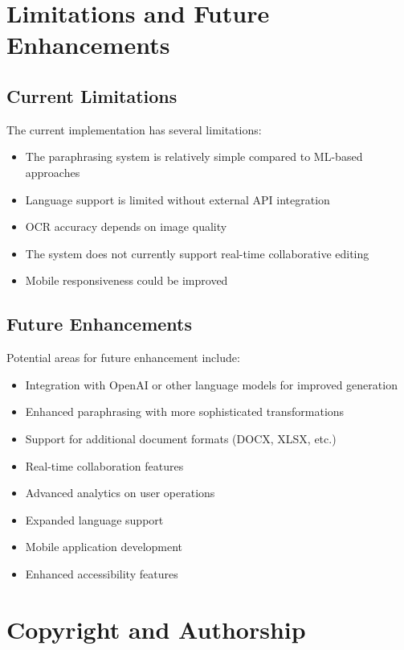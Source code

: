 \documentclass[12pt,a4paper]{article}
\begin{document}
\section{Limitations and Future Enhancements}

\subsection{Current Limitations}

The current implementation has several limitations:

\begin{itemize}
    \item The paraphrasing system is relatively simple compared to ML-based approaches
    \item Language support is limited without external API integration
    \item OCR accuracy depends on image quality
    \item The system does not currently support real-time collaborative editing
    \item Mobile responsiveness could be improved
\end{itemize}

\subsection{Future Enhancements}

Potential areas for future enhancement include:

\begin{itemize}
    \item Integration with OpenAI or other language models for improved generation
    \item Enhanced paraphrasing with more sophisticated transformations
    \item Support for additional document formats (DOCX, XLSX, etc.)
    \item Real-time collaboration features
    \item Advanced analytics on user operations
    \item Expanded language support
    \item Mobile application development
    \item Enhanced accessibility features
\end{itemize}

\section{Copyright and Authorship}
\end{document}
